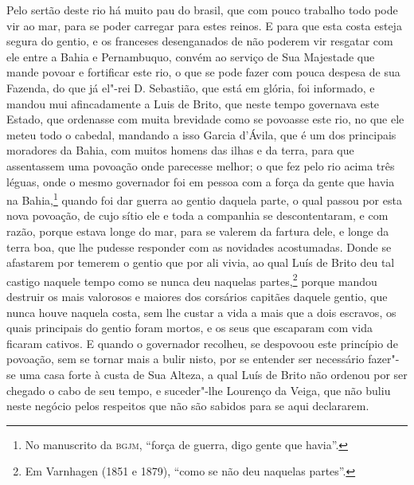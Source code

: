 Pelo sertão deste rio há muito pau do brasil, que com pouco trabalho todo pode vir ao mar,
para se poder carregar para estes reinos. E para que esta costa esteja segura do gentio, e
os franceses desenganados de não poderem vir resgatar com ele entre a Bahia e Pernambuquo,
convém ao serviço de Sua Majestade que mande povoar e fortificar este rio, o que se pode
fazer com pouca despesa de sua Fazenda, do que já el"-rei D. Sebastião, que está em glória,
foi informado, e mandou mui afincadamente a Luis de Brito, que neste tempo governava este
Estado, que ordenasse com muita brevidade como se povoasse este rio, no que ele meteu todo
o cabedal, mandando a isso Garcia d'Ávila, que é um dos principais moradores da Bahia, com
muitos homens das ilhas e da terra, para que assentassem uma povoação onde parecesse
melhor; o que fez pelo rio acima três léguas, onde o mesmo governador foi em pessoa com a
força da gente que havia na Bahia,\footnote{ No manuscrito da \textsc{bgjm}, ``força de
guerra, digo gente que havia''.} quando foi dar guerra ao gentio daquela parte, o qual
passou por esta nova povoação, de cujo sítio ele e toda a companhia se descontentaram, e
com razão, porque estava longe do mar, para se valerem da fartura dele, e longe da terra
boa, que lhe pudesse responder com as novidades acostumadas. Donde se afastarem por
temerem o gentio que por ali vivia, ao qual Luís de Brito deu tal castigo naquele tempo
como se nunca deu naquelas partes,\footnote{ Em Varnhagen (1851 e 1879), ``como se não deu
naquelas partes''.} porque mandou destruir os mais valorosos e maiores dos corsários
capitães daquele gentio, que nunca houve naquela costa, sem lhe custar a vida a mais que a
dois escravos, os quais principais do gentio foram mortos, e os seus que escaparam com
vida ficaram cativos. E quando o governador recolheu, se despovoou este princípio de
povoação, sem se tornar mais a bulir nisto, por se entender ser necessário fazer"-se uma
casa forte à custa de Sua Alteza, a qual Luís de Brito não ordenou por ser chegado o cabo
de seu tempo, e suceder"-lhe Lourenço da Veiga, que não buliu neste negócio pelos respeitos
que não são sabidos para se aqui declararem.

